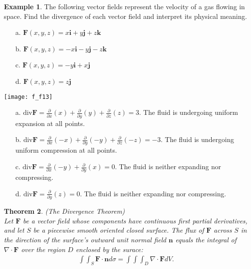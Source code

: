 \documentclass[12pt, letter]{article}
\theoremstyle{plain}
\newtheorem{theorem}{Theorem}
\numberwithin{theorem}{section}
\theoremstyle{definition}
\newtheorem{example}[theorem]{Example}
\begin{document}
\begin{example}
The following vector fields represent the velocity of a gas flowing in space. Find the divergence of each vector field and interpret its physical meaning.
\begin{itemize}
\item[a.] $\bm{F}(x,y,z) = x\bm{i}+y\bm{j}+z\bm{k}$
\item[b.] $\bm{F}(x,y,z) = -x\bm{i}-y\bm{j}-z\bm{k}$
\item[c.] $\bm{F}(x,y,z) = -y\bm{i}+x\bm{j}$
\item[d.] $\bm{F}(x,y,z) = z\bm{j}$
\end{itemize}

\bigskip

\begin{center}
\texttt{[image: f\_f13]}
\end{center}

\bigskip

\begin{itemize}
\item[a.] $\text{div}\bm{F} = \frac{\partial}{\partial x}(x)+\frac{\partial}{\partial y}(y)+\frac{\partial}{\partial z}(z) = 3$. The fluid is undergoing uniform expansion at all points.
\item[b.] $\text{div}\bm{F} = \frac{\partial}{\partial x}(-x)+\frac{\partial}{\partial y}(-y)+\frac{\partial}{\partial z}(-z) = -3$. The fluid is undergoing uniform compression at all points.
\item[c.] $\text{div}\bm{F} = \frac{\partial}{\partial x}(-y)+\frac{\partial}{\partial y}(x)=0$. The fluid is neither expanding nor compressing.
\item[d.] $\text{div}\bm{F} = \frac{\partial}{\partial y}(z)=0$. The fluid is neither expanding nor compressing.
\end{itemize}
\end{example}

\bigskip

\hrulefill

\bigskip

\begin{theorem}{(The Divergence Theorem)}
\\
Let $\bm{F}$ be a vector field whose components have continuous first partial derivatives, and let $S$ be a piecewise smooth oriented closed surface. The flux of $\bm{F}$ across $S$ in the direction of the surface's outward unit normal field $\bm{n}$ equals the integral of $\nabla \cdot \bm{F}$ over the region $D$ enclosed by the surace:
\begin{align*}
\int\int_S \bm{F}\cdot\bm{n}d\sigma = \int\int\int_D \nabla \cdot \bm{F} dV.
\end{align*}
\end{theorem}
\end{document}

